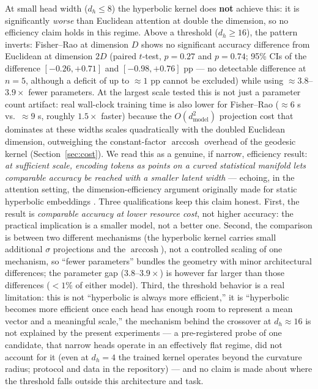 \documentclass[11pt]{article}
\DeclareMathOperator{\arccosh}{arccosh}
\begin{document}
At small head width ($d_h \le 8$) the hyperbolic kernel does \textbf{not} achieve this: it is significantly \emph{worse} than Euclidean attention at double the dimension, so no efficiency claim holds in this regime. Above a threshold ($d_h \ge 16$), the pattern inverts: Fisher--Rao at dimension $D$ shows no significant accuracy difference from Euclidean at dimension $2D$ (paired $t$-test, $p = 0.27$ and $p = 0.74$; 95\% CIs of the difference $[-0.26, +0.71]$ and $[-0.98, +0.76]$ pp --- no detectable difference at $n = 5$, although a deficit of up to $\approx 1$ pp cannot be excluded) while using $\approx 3.8$--$3.9\times$ fewer parameters. At the largest scale tested this is not just a parameter count artifact: real wall-clock training time is also lower for Fisher--Rao ($\approx 6$ s vs.\ $\approx 9$ s, roughly $1.5\times$ faster) because the $O(d_{\mathrm{model}}^2)$ projection cost that dominates at these widths scales quadratically with the doubled Euclidean dimension, outweighing the constant-factor $\arccosh$ overhead of the geodesic kernel (Section~\ref{sec:cost}). We read this as a genuine, if narrow, efficiency result: \emph{at sufficient scale, encoding tokens as points on a curved statistical manifold lets comparable accuracy be reached with a smaller latent width} --- echoing, in the attention setting, the dimension-efficiency argument originally made for static hyperbolic embeddings \cite{nickel2017}. Three qualifications keep this claim honest. First, the result is \emph{comparable accuracy at lower resource cost}, not higher accuracy: the practical implication is a smaller model, not a better one. Second, the comparison is between two different mechanisms (the hyperbolic kernel carries small additional $\sigma$ projections and the $\arccosh$), not a controlled scaling of one mechanism, so ``fewer parameters'' bundles the geometry with minor architectural differences; the parameter gap ($3.8$--$3.9\times$) is however far larger than those differences ($<1\%$ of either model). Third, the threshold behavior is a real limitation: this is not ``hyperbolic is always more efficient,'' it is ``hyperbolic becomes more efficient once each head has enough room to represent a mean vector and a meaningful scale,'' the mechanism behind the crossover at $d_h \approx 16$ is not explained by the present experiments --- a pre-registered probe of one candidate, that narrow heads operate in an effectively flat regime, did not account for it (even at $d_h = 4$ the trained kernel operates beyond the curvature radius; protocol and data in the repository) --- and no claim is made about where the threshold falls outside this architecture and task.
\end{document}

